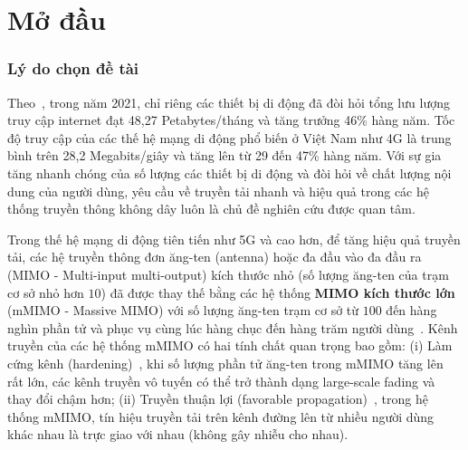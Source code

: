 \clearpage
{}

\chapter*{Mở đầu}
\label{sec:intro}

\subsection*{Lý do chọn đề tài}

Theo~\cite{Mtawa2019}, trong năm 2021, chỉ riêng các thiết bị di động đã đòi hỏi tổng lưu lượng truy cập internet đạt 48,27 Petabytes/tháng và tăng trưởng 46\% hàng năm. Tốc độ truy cập của các thế hệ mạng di động phổ biến ở Việt Nam như 4G là trung bình trên 28,2 Megabits/giây và tăng lên từ 29 đến 47\% hàng năm. Với sự gia tăng nhanh chóng của số lượng các thiết bị di động và đòi hỏi về chất lượng nội dung của người dùng, yêu cầu về truyền tải nhanh và hiệu quả trong các hệ thống truyền thông không dây luôn là chủ đề nghiên cứu được quan tâm.

Trong thế hệ mạng di động tiên tiến như 5G và cao hơn, để tăng hiệu quả truyền tải, các hệ truyền thông đơn ăng-ten (antenna) hoặc đa đầu vào đa đầu ra (MIMO - Multi-input multi-output) kích thước nhỏ (số lượng ăng-ten của trạm cơ sở nhỏ hơn $10$) đã được thay thế bằng các hệ thống \textbf{MIMO kích thước lớn} (mMIMO - Massive MIMO) với số lượng ăng-ten trạm cơ sở từ $100$ đến hàng nghìn phần tử và phục vụ cùng lúc hàng chục đến hàng trăm người dùng~\cite{Larsson2014}. Kênh truyền của các hệ thống mMIMO có hai tính chất quan trọng bao gồm: (i) Làm cứng kênh (hardening)~\cite{Willhammar2020}, khi số lượng phần tử ăng-ten trong mMIMO tăng lên rất lớn, các kênh truyền vô tuyến có thể trở thành dạng large-scale fading và thay đổi chậm hơn; (ii) Truyền thuận lợi (favorable propagation)~\cite{Ngo2014}, trong hệ thống mMIMO, tín hiệu truyền tải trên kênh đường lên từ nhiều người dùng khác nhau là trực giao với nhau (không gây nhiễu cho nhau).

